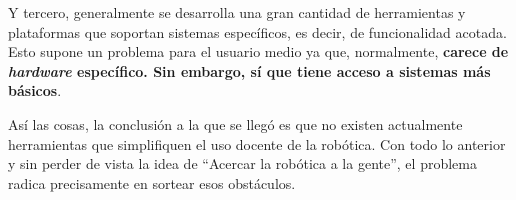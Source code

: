 Y tercero, generalmente se desarrolla una gran cantidad de herramientas y plataformas que soportan sistemas específicos, es decir, de funcionalidad acotada. Esto supone un problema para el usuario medio ya que, normalmente, \textbf{carece de \textit{hardware} específico. Sin embargo, sí que tiene acceso a sistemas más básicos}.

Así las cosas, la conclusión a la que se llegó es que no existen actualmente herramientas que simplifiquen el uso docente de la robótica. Con todo lo anterior y sin perder de vista la idea de ``Acercar la robótica a la gente'', el problema radica precisamente en sortear esos obstáculos.
